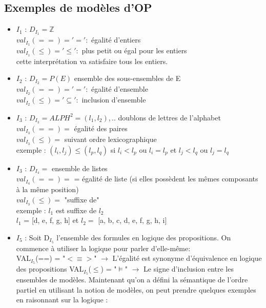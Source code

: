\subsection{Exemples de modèles d'OP}
\begin{itemize}
\item \underline{$I_{1}$} : $D_{I_{1}} =  \mathbb{Z}$ \\
$ val_{I_{1}}(==) = '=' :$ égalité d'entiers \\
$ val_{I_{1}}(\leq) = '\leq' :$ plus petit ou égal pour les entiers\\
cette interprétation va satisfaire tous les entiers.
\item \underline{$I_{2}$} : $D_{I_{2}} =  P(E)$ ensemble des sous-ensembles de E\\
$ val_{I_{2}}(==) = '=' :$ égalité d'ensemble \\
$ val_{I_{2}}(\leq) = '\subseteq' :$ inclusion d'ensemble
\item \underline{$I_{3}$} : $D_{I_{3}} = ALPH^{2} = {(l_{1},l_{2}),..}$ doublons de lettres de l'alphabet\\
$ val_{I_{3}}(==) = $ égalité des paires \\
$ val_{I_{3}}(\leq) =$ suivant ordre lexicographique\\
exemple : $(l_{i},l_{j}) \leq (l_{p},l_{q})$ si $ l_{i} < l_{p}$ ou $ l_{i} = l_{p}$ et $ l_{j} < l_{q}$ ou $ l_{j} = l_{q}$
\item \underline{$I_{3}$} : $D_{I_{4}} =$ ensemble de listes\\
$ val_{I_{4}}(==) = $ = égalité de liste (si elles possèdent les mêmes composants à la même position)\\
$ val_{I_{3}}(\leq) =$ "suffixe de" \\
exemple : $l_{1} $ est suffixe de $l_{2}$ \\
$l_{1} $ = [d, e, f, g, h] et $l_{2} =$ [a, b, c, d, e, f, g, h, i]
\item \underline{$I_{5}$} : Soit D$_{I_{5}}$ l'ensemble des formules en logique des propositions. On commence à utiliser la logique pour parler d'elle-même:\\
VAL$_{I_{5}}$(==) = "$<\equiv>$" $\rightarrow$ L'égalité est synonyme d'équivalence en logique des propositions
VAL$_{I_{5}}$($\leq$) = "$\models$" $\rightarrow$ Le signe d'inclusion entre les ensembles de modèles.
Maintenant qu'on a défini la sémantique de l'ordre partiel en utilisant la notion de modèles, on peut prendre quelques exemples en raisonnant sur la logique :\\

\end{itemize}

